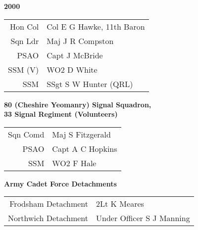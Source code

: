 \begin{center}
  \Huge
  \textbf{2000}
\end{center}

\begin{center}
  \small
  \begin{tabular}{rl}
    Hon Col & Col E G Hawke, 11th Baron \\
    Sqn Ldr & Maj J R Compston \\
    PSAO & Capt J McBride \\
    SSM (V) & WO2 D White \\
    SSM & SSgt S W Hunter (QRL) \\
  \end{tabular}
\end{center}

\begin{center}
  \Large
  \textbf{80 (Cheshire Yeomanry) Signal Squadron, \\ 33 Signal Regiment (Volunteers)}
\end{center}

\begin{center}
  \small
  \begin{tabular}{rl}
    Sqn Comd & Maj S Fitzgerald \\
    PSAO & Capt A C Hopkins \\
    SSM & WO2 F Hale \\
  \end{tabular}
\end{center}

\begin{center}
  \Large
  \textbf{Army Cadet Force Detachments}
\end{center}

\begin{center}
  \small
  \begin{tabular}{rl}
    Frodsham Detachment & 2Lt K Meares \\
    Northwich Detachment & Under Officer S J Manning \\
  \end{tabular}
\end{center}

\vspace{50mm}

\pagebreak
